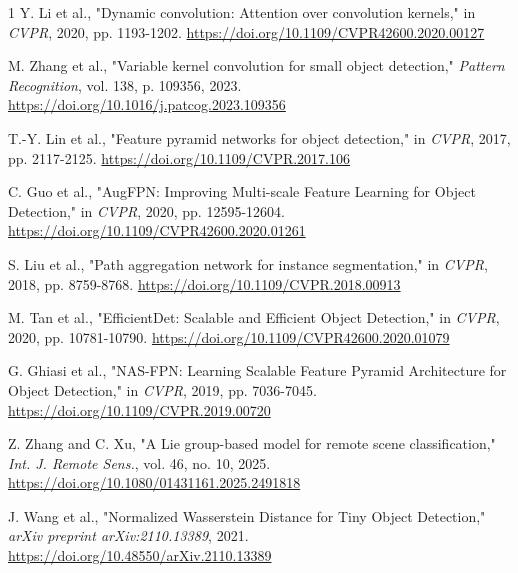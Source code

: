 \documentclass[lettersize,journal]{IEEEtran}
\begin{document}
\begin{thebibliography}{1}
 Y. Li et al., "Dynamic convolution: Attention over convolution kernels," in \textit{CVPR}, 2020, pp. 1193-1202. \url{https://doi.org/10.1109/CVPR42600.2020.00127}

 M. Zhang et al., "Variable kernel convolution for small object detection," \textit{Pattern Recognition}, vol. 138, p. 109356, 2023. \url{https://doi.org/10.1016/j.patcog.2023.109356}

 T.-Y. Lin et al., "Feature pyramid networks for object detection," in \textit{CVPR}, 2017, pp. 2117-2125. \url{https://doi.org/10.1109/CVPR.2017.106}

 C. Guo et al., "AugFPN: Improving Multi-scale Feature Learning for Object Detection," in \textit{CVPR}, 2020, pp. 12595-12604. \url{https://doi.org/10.1109/CVPR42600.2020.01261}

 S. Liu et al., "Path aggregation network for instance segmentation," in \textit{CVPR}, 2018, pp. 8759-8768. \url{https://doi.org/10.1109/CVPR.2018.00913}

 M. Tan et al., "EfficientDet: Scalable and Efficient Object Detection," in \textit{CVPR}, 2020, pp. 10781-10790. \url{https://doi.org/10.1109/CVPR42600.2020.01079}

 G. Ghiasi et al., "NAS-FPN: Learning Scalable Feature Pyramid Architecture for Object Detection," in \textit{CVPR}, 2019, pp. 7036-7045. \url{https://doi.org/10.1109/CVPR.2019.00720}

 Z. Zhang and C. Xu, "A Lie group-based model for remote scene classification," \textit{Int. J. Remote Sens.}, vol. 46, no. 10, 2025. \url{https://doi.org/10.1080/01431161.2025.2491818}

 J. Wang et al., "Normalized Wasserstein Distance for Tiny Object Detection," \textit{arXiv preprint arXiv:2110.13389}, 2021. \url{https://doi.org/10.48550/arXiv.2110.13389}

\end{thebibliography}
\end{document}
